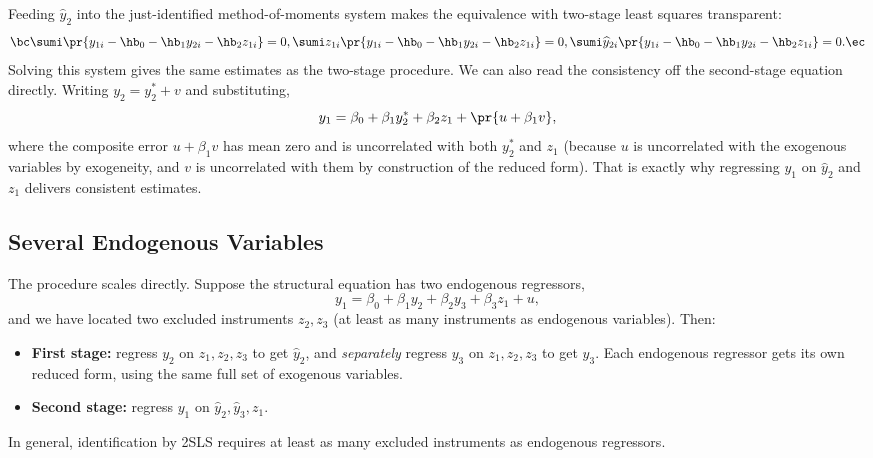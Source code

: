 Feeding $\widehat y_2$ into the just-identified method-of-moments system makes the equivalence with two-stage least squares transparent:
\[
\bc
\sumi \pr{y_{1i}-\hb_0-\hb_1 y_{2i}-\hb_2 z_{1i}} = 0,\\[1mm]
\sumi z_{1i}\pr{y_{1i}-\hb_0-\hb_1 y_{2i}-\hb_2 z_{1i}} = 0,\\[1mm]
\sumi \widehat y_{2i}\pr{y_{1i}-\hb_0-\hb_1 y_{2i}-\hb_2 z_{1i}} = 0.
\ec
\]
Solving this system gives the same estimates as the two-stage procedure. We can also read the consistency off the second-stage equation directly. Writing $y_2 = y_2^{*} + v$ and substituting,
\[
y_1 = \beta_0 + \beta_1 y_2^{*} + \beta_2 z_1 + \pr{u + \beta_1 v},
\]
where the composite error $u+\beta_1 v$ has mean zero and is uncorrelated with both $y_2^{*}$ and $z_1$ (because $u$ is uncorrelated with the exogenous variables by exogeneity, and $v$ is uncorrelated with them by construction of the reduced form). That is exactly why regressing $y_1$ on $\widehat y_2$ and $z_1$ delivers consistent estimates.


\subsection{Several Endogenous Variables}

The procedure scales directly. Suppose the structural equation has two endogenous regressors,
\[
y_1 = \beta_0 + \beta_1 y_2 + \beta_2 y_3 + \beta_3 z_1 + u,
\]
and we have located two excluded instruments $z_2,z_3$ (at least as many instruments as endogenous variables). Then:
\begin{itemize}
    \item \textbf{First stage:} regress $y_2$ on $z_1,z_2,z_3$ to get $\widehat y_2$, and \emph{separately} regress $y_3$ on $z_1,z_2,z_3$ to get $\widehat y_3$. Each endogenous regressor gets its own reduced form, using the same full set of exogenous variables.
    \item \textbf{Second stage:} regress $y_1$ on $\widehat y_2,\widehat y_3,z_1$.
\end{itemize}
In general, identification by 2SLS requires at least as many excluded instruments as endogenous regressors.


